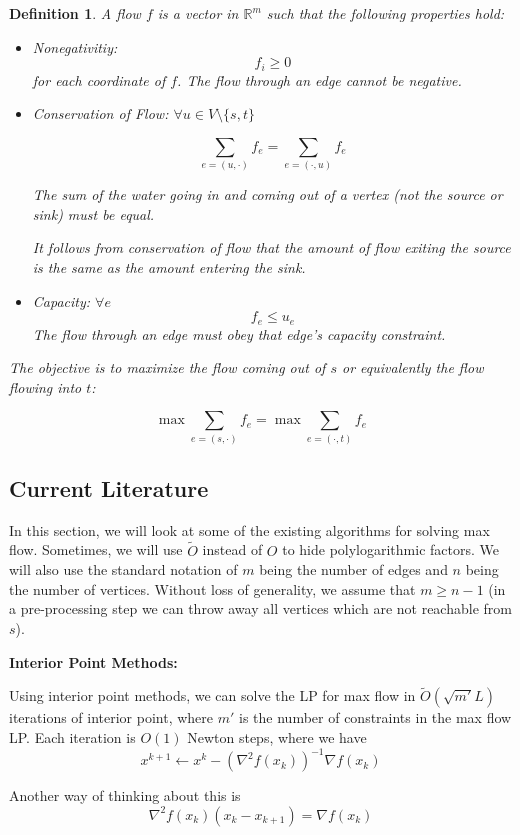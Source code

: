 \documentclass[11pt]{article}
\newtheorem{definition}[theorem]{Definition}
\begin{document}
\begin{definition} 
A flow $f$ is a vector in $\mathbb{R}^m$ such that the following properties hold:
\begin{itemize}
\item Nonegativitiy: $$f_i \geq 0$$ for each coordinate of $f$.
The flow through an edge cannot be negative. 
\item Conservation of Flow: $\forall u \in V \setminus \{s,t\}$

$$\sum_{e = (u, \cdot)} f_{e} = \sum_{e = (\cdot, u)} f_e$$

The sum of the water going in and coming out of a vertex (not the source or sink) must be equal. 

It follows from conservation of flow that the amount of flow exiting the source is the same as the amount entering the sink. 

\item Capacity: 
$\forall e$ $$f_e \leq u_e$$
The flow through an edge must obey that edge's capacity constraint. 
\end{itemize}

The objective is to maximize the flow coming out of $s$ or equivalently the flow flowing into $t$:

$$ \max \sum_{e = (s, \cdot)} f_e = \max \sum_{e = (\cdot, t)} f_e $$
\end{definition}

\subsection{Current Literature}
In this section, we will look at some of the existing algorithms for solving max flow. Sometimes, we will use $\tilde{O}$ instead of $O$ to hide polylogarithmic factors. We will also use the standard notation of $m$ being the number of edges and $n$ being the number of vertices. Without loss of generality, we assume that $m \geq n-1$ (in a pre-processing step we can throw away all vertices which are not reachable from $s$).

\textbf{Interior Point Methods: }

Using interior point methods, we can solve the LP for max flow in $\tilde{O}(\sqrt{m'}L)$ iterations of interior point, where $m'$ is the number of constraints in the max flow LP. Each iteration is $O(1)$ Newton steps, where we have 
$$ x^{k+1} \leftarrow x^{k} - \left( \nabla^2 f(x_k) \right)^{-1} \nabla f(x_k)$$ 

Another way of thinking about this is $$ \nabla^2 f(x_k) \left( x_{k} - x_{k+1}\right) = \nabla f(x_k) $$
\end{document}
